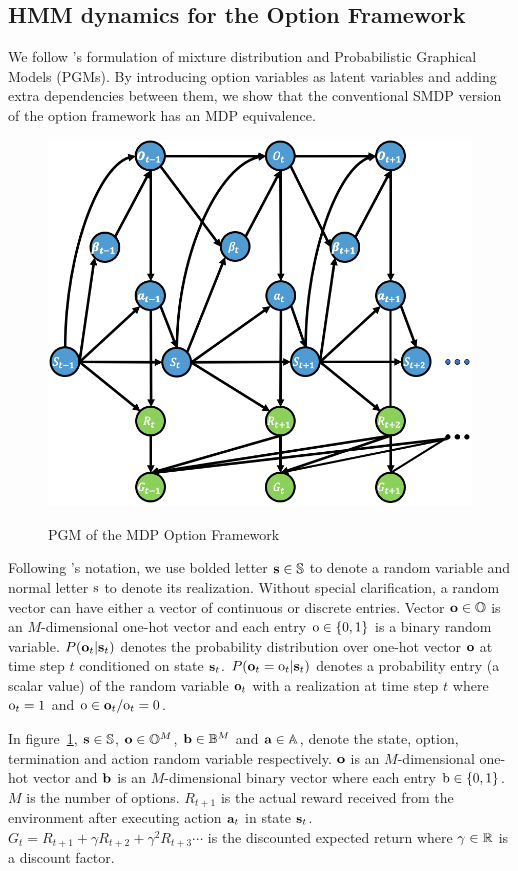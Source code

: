 \subsection{HMM dynamics for the Option Framework}
\label{sec:appen_hmm}

We follow 's formulation of mixture
distribution and Probabilistic Graphical Models (PGMs). By
introducing option variables as latent variables and adding extra
dependencies between them, we show that the conventional SMDP
version of the option framework
\cite{bacon2017option,sutton2018reinforcement,sutton1999between,harb2018waiting,zhang2019dac}
has an MDP equivalence.
\begin{figure}[th!]
  \centering
  \includegraphics[width=0.5\linewidth]{Part1/figures/oc_pgm.png}\\
  \caption{\label{fig:oc_pgm} PGM of the MDP Option Framework}
\end{figure}
Following \citet{bishop2006pattern}'s notation, we use bolded
letter ${\mathbf{s}}\in{\mathbb{S}}$ to denote a random variable and normal letter
${\textnormal{s}}$ to denote its realization. Without special clarification, a
random vector can have either a vector of continuous or discrete
entries. Vector ${\mathbf{o}}\in{\mathbb{O}}$ is an $M$-dimensional one-hot vector
and each entry ${\textnormal{o}}\in\{0,1\}$ is a binary random variable.
$P({\mathbf{o}}_t|{\mathbf{s}}_t)$ denotes the probability distribution over
one-hot vector ${\mathbf{o}}$ at time step $t$ conditioned on state
${\mathbf{s}}_t$. $P({\mathbf{o}}_t={\textnormal{o}}_t|{\mathbf{s}}_t)$ denotes a probability entry (a
scalar value) of the random variable ${\mathbf{o}}_t$ with a realization
at time step $t$ where ${\textnormal{o}}_t=1$ and ${\textnormal{o}}\in{\mathbf{o}}_t/{\textnormal{o}}_t=0$.

In figure~\ref{fig:oc_pgm}, ${\mathbf{s}}\in{\mathbb{S}}$, ${\mathbf{o}}\in{\mathbb{O}}^M$,
${\mathbf{b}}\in{\mathbb{B}}^M$ and ${\mathbf{a}} \in {\mathbb{A}}$, denote the state, option,
termination and action random variable respectively. ${\mathbf{o}}$ is an
$M$-dimensional one-hot vector and ${\mathbf{b}}$ is an $M$-dimensional
binary vector where each entry ${\textnormal{b}}\in\{0,1\}$. $M$ is the number
of options. $R_{t+1}$ is the actual reward received from the
environment after executing action ${\mathbf{a}}_{t}$ in state ${\mathbf{s}}_t$.
$G_t=R_{t+1}+\gamma R_{t+2}+\gamma^2R_{t+3}\cdots$ is the
discounted expected return where $\gamma\in {\mathbb{R}}$ is a discount
factor.

